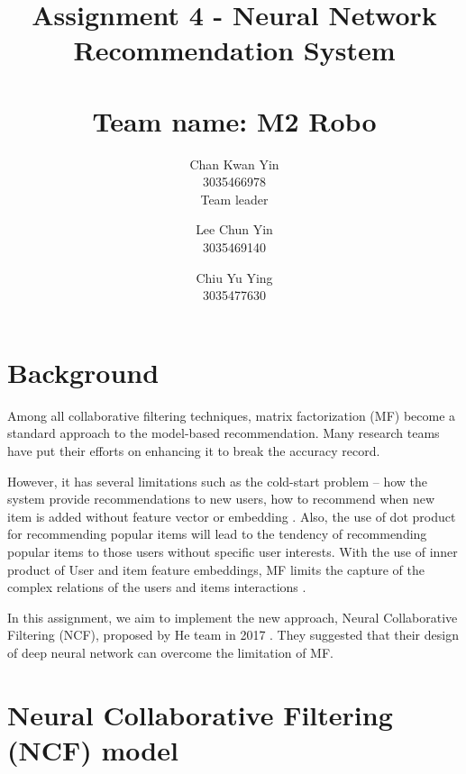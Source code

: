 \documentclass[final]{cvpr}
\begin{document}
\title{
	Assignment 4 - Neural Network Recommendation System \\~\\
	\large{Team name: M2 Robo}
}

\author{
	Chan Kwan Yin\\
	3035466978 \\
	Team leader

	\and

	Lee Chun Yin\\
	3035469140\\

	\and

	Chiu Yu Ying\\
	3035477630
}

\maketitle

\clearpage

\section{Background}

Among all collaborative filtering techniques, matrix factorization (MF) become a standard approach to the model-based recommendation. Many research teams have put their efforts on enhancing it to break the accuracy record. 

However, it has several limitations such as the cold-start problem -- how the system provide recommendations to new users, how to recommend when new item is added without feature vector or embedding \cite{FMF}. Also, the use of dot product for recommending popular items will lead to the tendency of recommending popular items to those users without specific user interests. With the use of inner product of User and item feature embeddings, MF limits the capture of the complex relations  of the users and items interactions \cite{NeuralCF}.

In this assignment, we aim to implement the new approach, Neural Collaborative Filtering (NCF), proposed by He team in 2017 \cite{NeuralCF}. They suggested that their design of deep neural network can overcome the limitation of MF.

\section{Neural Collaborative Filtering (NCF) model}
\end{document}
